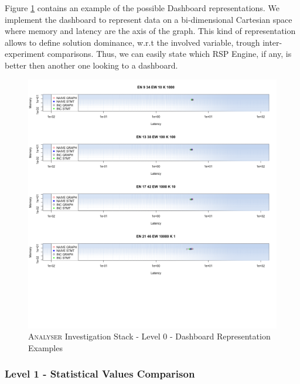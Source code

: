 \noindent Figure \ref{fig:dashboard-example} contains an example of the possible Dashboard representations. We implement the dashboard to represent data on a bi-dimensional Cartesian space where memory and latency are the axis of the graph. This kind of representation allows to define solution dominance, w.r.t the involved variable, trough inter-experiment comparisons. Thus, we can easily state which RSP Engine, if any, is better then another one looking to a dashboard.

\begin{figure}[tbh]
  \centering
	\includegraphics[width=0.45\linewidth]{images/dashboard-example}
	\caption[\textsc{Analyser} Investigation Stack - Level 0 -  Dashboard Representation Examples]{\textsc{Analyser} Investigation Stack - Level 0 -  Dashboard Representation Examples}
  	\label{fig:dashboard-example}
\end{figure}


\subsubsection{Level 1 - Statistical Values Comparison}\label{sec:impl-level1}

